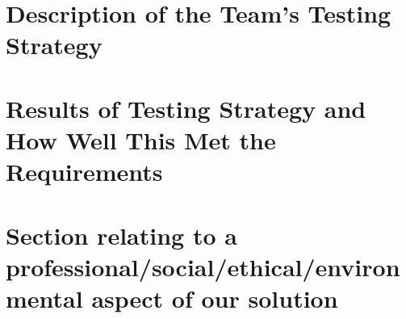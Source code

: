 \section{Description of the Team's Testing Strategy}
\section{Results of Testing Strategy and How Well This Met the Requirements}
\section{Section relating to a professional/social/ethical/environmental
        aspect of our solution} %
